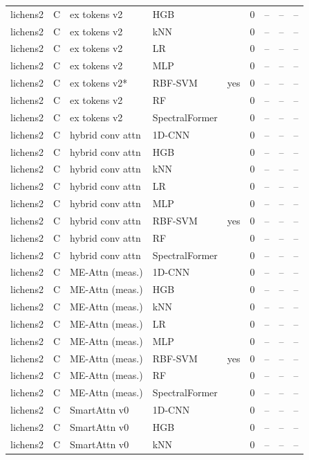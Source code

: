 \begin{tabular}{lllllcccc}
lichens2 & C & ex tokens v2 & HGB &  & 0 & -- & -- & -- \\
lichens2 & C & ex tokens v2 & kNN &  & 0 & -- & -- & -- \\
lichens2 & C & ex tokens v2 & LR &  & 0 & -- & -- & -- \\
lichens2 & C & ex tokens v2 & MLP &  & 0 & -- & -- & -- \\
lichens2 & C & ex tokens v2* & RBF-SVM & yes & 0 & -- & -- & -- \\
lichens2 & C & ex tokens v2 & RF &  & 0 & -- & -- & -- \\
lichens2 & C & ex tokens v2 & SpectralFormer &  & 0 & -- & -- & -- \\
lichens2 & C & hybrid conv attn & 1D-CNN &  & 0 & -- & -- & -- \\
lichens2 & C & hybrid conv attn & HGB &  & 0 & -- & -- & -- \\
lichens2 & C & hybrid conv attn & kNN &  & 0 & -- & -- & -- \\
lichens2 & C & hybrid conv attn & LR &  & 0 & -- & -- & -- \\
lichens2 & C & hybrid conv attn & MLP &  & 0 & -- & -- & -- \\
lichens2 & C & hybrid conv attn & RBF-SVM & yes & 0 & -- & -- & -- \\
lichens2 & C & hybrid conv attn & RF &  & 0 & -- & -- & -- \\
lichens2 & C & hybrid conv attn & SpectralFormer &  & 0 & -- & -- & -- \\
lichens2 & C & ME-Attn (meas.) & 1D-CNN &  & 0 & -- & -- & -- \\
lichens2 & C & ME-Attn (meas.) & HGB &  & 0 & -- & -- & -- \\
lichens2 & C & ME-Attn (meas.) & kNN &  & 0 & -- & -- & -- \\
lichens2 & C & ME-Attn (meas.) & LR &  & 0 & -- & -- & -- \\
lichens2 & C & ME-Attn (meas.) & MLP &  & 0 & -- & -- & -- \\
lichens2 & C & ME-Attn (meas.) & RBF-SVM & yes & 0 & -- & -- & -- \\
lichens2 & C & ME-Attn (meas.) & RF &  & 0 & -- & -- & -- \\
lichens2 & C & ME-Attn (meas.) & SpectralFormer &  & 0 & -- & -- & -- \\
lichens2 & C & SmartAttn v0 & 1D-CNN &  & 0 & -- & -- & -- \\
lichens2 & C & SmartAttn v0 & HGB &  & 0 & -- & -- & -- \\
lichens2 & C & SmartAttn v0 & kNN &  & 0 & -- & -- & -- \\

\end{tabular}
